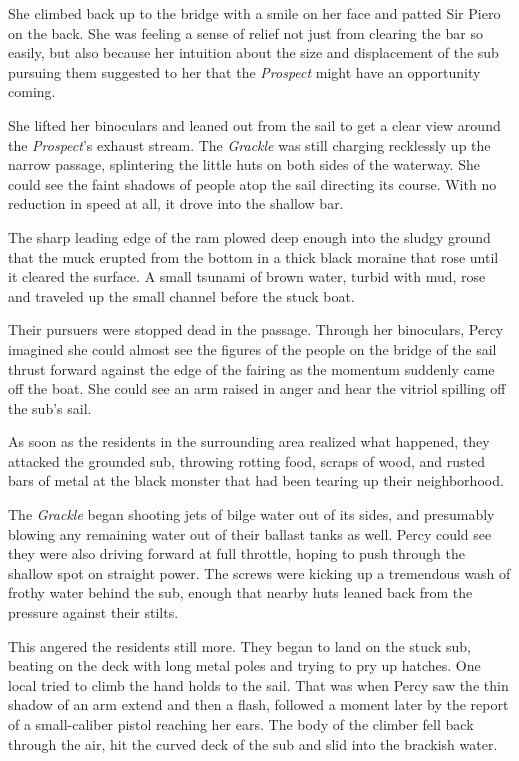 \documentclass[
]{scrbook}
\begin{document}
She climbed back up to the bridge with a smile on her face and patted
Sir Piero on the back. She was feeling a sense of relief not just from
clearing the bar so easily, but also because her intuition about the
size and displacement of the sub pursuing them suggested to her that the
\emph{Prospect} might have an opportunity coming.

She lifted her binoculars and leaned out from the sail to get a clear
view around the \emph{Prospect}'s exhaust stream. The \emph{Grackle} was
still charging recklessly up the narrow passage, splintering the little
huts on both sides of the waterway. She could see the faint shadows of
people atop the sail directing its course. With no reduction in speed at
all, it drove into the shallow bar.

The sharp leading edge of the ram plowed deep enough into the sludgy
ground that the muck erupted from the bottom in a thick black moraine
that rose until it cleared the surface. A small tsunami of brown water,
turbid with mud, rose and traveled up the small channel before the stuck
boat.

Their pursuers were stopped dead in the passage. Through her binoculars,
Percy imagined she could almost see the figures of the people on the
bridge of the sail thrust forward against the edge of the fairing as the
momentum suddenly came off the boat. She could see an arm raised in
anger and hear the vitriol spilling off the sub's sail.

As soon as the residents in the surrounding area realized what happened,
they attacked the grounded sub, throwing rotting food, scraps of wood,
and rusted bars of metal at the black monster that had been tearing up
their neighborhood.

The \emph{Grackle} began shooting jets of bilge water out of its sides,
and presumably blowing any remaining water out of their ballast tanks as
well. Percy could see they were also driving forward at full throttle,
hoping to push through the shallow spot on straight power. The screws
were kicking up a tremendous wash of frothy water behind the sub, enough
that nearby huts leaned back from the pressure against their stilts.

This angered the residents still more. They began to land on the stuck
sub, beating on the deck with long metal poles and trying to pry up
hatches. One local tried to climb the hand holds to the sail. That was
when Percy saw the thin shadow of an arm extend and then a flash,
followed a moment later by the report of a small-caliber pistol reaching
her ears. The body of the climber fell back through the air, hit the
curved deck of the sub and slid into the brackish water.
\end{document}
